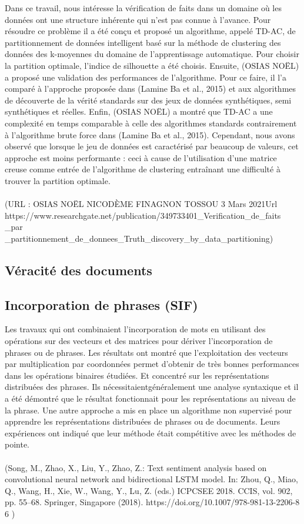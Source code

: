 \documentclass[12pt]{report}
\begin{document}
Dans ce travail, nous intéresse la vérification de faits dans un domaine où
les données ont une structure inhérente qui n’est pas connue à l’avance.
Pour résoudre ce problème il a été conçu et proposé un algorithme, appelé
TD-AC, de partitionnement de données intelligent basé sur la méthode de
clustering des données des k-moyennes du domaine de l’apprentissage
automatique. Pour choisir la partition optimale, l’indice de silhouette a été
choisis. Ensuite, (OSIAS NOËL) a proposé une validation des
performances de l’algorithme. Pour ce faire, il l’a comparé à l’approche
proposée dans (Lamine Ba et al., 2015) et aux algorithmes de découverte
de la vérité standards sur des jeux de données synthétiques, semi
synthétiques et réelles. Enfin, (OSIAS NOËL) a montré que TD-AC a une
complexité en temps comparable à celle des algorithmes standards
contrairement à l’algorithme brute force dans (Lamine Ba et al., 2015).
Cependant, nous avons observé que lorsque le jeu de données est
caractérisé par beaucoup de valeurs, cet approche est moins
performante : ceci à cause de l’utilisation d’une matrice creuse comme
entrée de l’algorithme de clustering entraînant une difficulté à trouver la
partition optimale.
\\ \\(URL : OSIAS NOËL NICODÈME FINAGNON TOSSOU 3 Mars 2021Url
https://www.researchgate.net/publication/349733401\_Verification\_de\_faits \_par\\\_partitionnement\_de\_donnees\_Truth\_discovery\_by\_data\_partitioning)

\subsection*{Véracité des documents}

\subsection{Incorporation de phrases (SIF)}

Les travaux qui ont combinaient l'incorporation de mots en utilisant des
opérations sur des vecteurs et des matrices pour dériver l'incorporation de
phrases ou de phrases. Les résultats ont montré que l'exploitation des
vecteurs par multiplication par coordonnées permet d'obtenir de très
bonnes performances dans les opérations binaires étudiées. Et concentré
sur les représentations distribuées des phrases. Ils nécessitaientgénéralement une analyse syntaxique et il a été démontré que le résultat
fonctionnait pour les représentations au niveau de la phrase. Une autre
approche a mis en place un algorithme non supervisé pour apprendre les
représentations distribuées de phrases ou de documents. Leurs expériences
ont indiqué que leur méthode était compétitive avec les méthodes de
pointe.
\\ \\(Song, M., Zhao, X., Liu, Y., Zhao, Z.: Text sentiment analysis based on
convolutional neural network and bidirectional LSTM model. In: Zhou,
Q., Miao, Q., Wang, H., Xie, W., Wang, Y., Lu, Z. (eds.) ICPCSEE 2018.
CCIS, vol. 902, pp. 55–68. Springer, Singapore (2018).
https://doi.org/10.1007/978-981-13-2206-8 6 )
\end{document}
